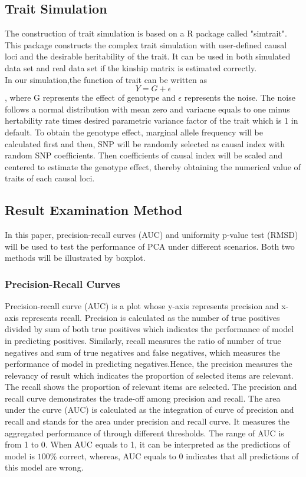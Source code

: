 \documentclass[12pt]{article}
\begin{document}
\subsection{Trait Simulation}
The construction of trait simulation is based on a R package called "simtrait". This package constructs the complex trait simulation with user-defined causal loci and the desirable heritability of the trait. It can be used in both simulated data set and real data set if the kinship matrix is estimated correctly. \\
In our simulation,the function of trait can be written as $$Y=G+ \epsilon$$ 
, where G represents the effect of genotype and $\epsilon$ represents the noise.  The noise follows a normal distribution with mean zero and variacne  equals to one minus hertability rate times desired parametric variance factor of the trait which is 1 in default. To obtain the genotype effect, marginal allele frequency will be calculated first and then, SNP will be randomly selected as causal index with random SNP coefficients. Then  coefficients of causal index will be scaled and centered to estimate the genotype effect, thereby obtaining the numerical value of traits of each causal loci.


\subsection{Result Examination Method}
In this paper, precision-recall curves (AUC) and uniformity p-value test (RMSD) will be used to test the performance of PCA under different scenarios. Both two methods will be illustrated by boxplot.
\subsubsection{Precision-Recall Curves}
Precision-recall curve (AUC) is a plot whose y-axis represents precision and x-axis represents recall. Precision is calculated as the number of true positives divided by sum of both true positives which indicates the performance of model in predicting positives. Similarly, recall measures the ratio of number of true negatives and sum of true negatives and false negatives, which measures the performance of model in predicting negatives.Hence, the precision measures the relevancy of result which indicates the proportion of selected items are relevant. The recall shows the proportion of relevant items are selected. The precision and recall curve demonstrates the trade-oﬀ among precision and recall. The area under the curve (AUC) is calculated as the integration of curve of precision and recall and stands for the area under precision and recall curve. It measures the aggregated performance of through diﬀerent thresholds. The range of AUC is from 1 to 0. When AUC equals to 1, it can be interpreted as the predictions of model is $100\%$ correct, whereas, AUC equals to 0 indicates that all predictions of this model are wrong. 
\end{document}
